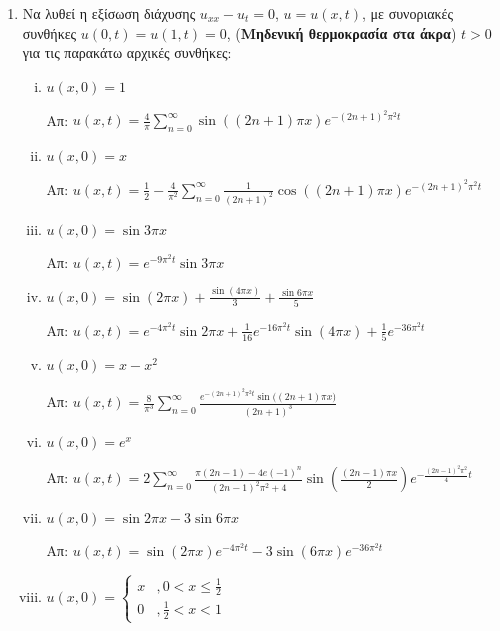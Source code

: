 \begin{enumerate}

	\item Να λυθεί η εξίσωση διάχυσης $ u_{xx} - u_t = 0 $, $ u=u(x,t) $, με συνοριακές συνθήκες $
		u(0,t) = u(1,t) = 0 $, ({\bfseries Μηδενική θερμοκρασία στα άκρα}) $ t>0 $ για τις παρακάτω αρχικές συνθήκες:

		\begin{enumerate}[(i)]
			\item $u(x,0) = 1$

				\hfill Απ: $ u(x,t) = \frac{ 4 }{ \pi } \sum_{n=0}^{\infty} \sin{((2n+1)\pi x)}
				e^{-(2n+1)^{2}\pi^{2}t} $

			\item $ u(x,0) = x $

				\hfill Απ: $ u(x,t) = \frac{1}{ 2 } - \frac{ 4 }{ \pi^{2} } \sum_{n=0}^{\infty}
				\frac{1}{ (2n+1)^{2} } \cos{((2n+1)\pi x)}e^{-(2n+1)^{2}\pi^{2}t } $

			\item $ u(x,0) = \sin{3\pi x} $

				\hfill Απ: $ u(x,t) = e^{-9\pi^{2}t} \sin{3\pi x}  $

			\item $ u(x,0) = \sin{(2\pi x)} + \frac{ \sin{(4\pi x)}  }{ 3 } + \frac{ \sin{6\pi x}
				 }{ 5 } $

				 \hfill Απ: $ u(x,t) = e^{-4\pi^{2}t} \sin{2\pi x} + \frac{1}{ 16 }
				 e^{-16\pi^{2}t}\sin (4\pi x) + \frac{1}{ 5 } e^{-36\pi^{2}t} $
				 
			 \item $ u(x,0) = x-x^{2} $ 

				 \hfill Απ: $ u(x,t) = \frac{ 8 }{ \pi^{3} } \sum_{n=0}^{\infty} \frac{
				 e^{-(2n+1)^{2}\pi^{2}t} \sin{((2n+1)}\pi x) }{ (2n+1)^{3} }  $

		\item $ u(x,0) = e^{x} $

			\hfill Απ: $ u(x,t) = 2 \sum_{n=0}^{\infty} \frac{ \pi(2n-1)-4e(-1)^{n}
			}{(2n-1)^{2}\pi^{2} +4  } \sin{\left(\frac{ (2n-1)\pi x }{ 2 }\right)}
				e^{-\frac{(2n-1)^{2}\pi^{2}}{4}t}  $

			\item $ u(x,0) = \sin{2\pi x} - 3 \sin{6\pi x} $

				\hfill Απ: $ u(x,t) = \sin{(2\pi x)} e^{-4\pi^{2}t} - 3 \sin{(6\pi x)}
				e^{-36\pi^{2}t }  $

			\item $ u(x,0) = \begin{cases}
					x &, 0<x\leq \frac{ 1 }{ 2 } \\
					0 &, \frac{1}{ 2 } <x<1
			\end{cases}$ 
			

\end{enumerate}
\end{enumerate}
